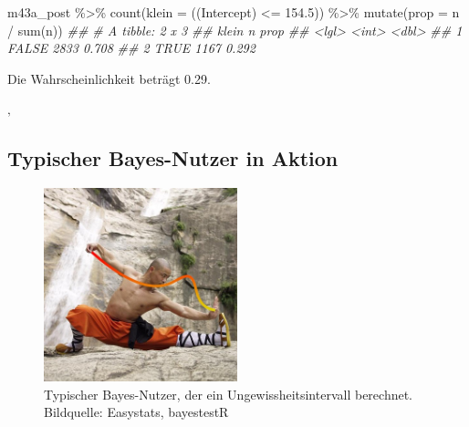 \documentclass[
  a4paper,
  DIV=11]{scrreprt}
\newenvironment{Shaded}{\begin{snugshade}}{\end{snugshade}}
\newcommand{\AttributeTok}[1]{\textcolor[rgb]{0.40,0.45,0.13}{#1}}
\newcommand{\DocumentationTok}[1]{\textcolor[rgb]{0.37,0.37,0.37}{\textit{#1}}}
\newcommand{\FloatTok}[1]{\textcolor[rgb]{0.68,0.00,0.00}{#1}}
\newcommand{\FunctionTok}[1]{\textcolor[rgb]{0.28,0.35,0.67}{#1}}
\newcommand{\NormalTok}[1]{\textcolor[rgb]{0.00,0.23,0.31}{#1}}
\newcommand{\SpecialCharTok}[1]{\textcolor[rgb]{0.37,0.37,0.37}{#1}}
\newcommand{\StringTok}[1]{\textcolor[rgb]{0.13,0.47,0.30}{#1}}
\theoremstyle{definition}
\theoremstyle{remark}
\begin{document}
\begin{Shaded}
\begin{Highlighting}[]
\NormalTok{m43a\_post }\SpecialCharTok{\%\textgreater{}\%} 
  \FunctionTok{count}\NormalTok{(}\AttributeTok{klein =}\NormalTok{ (}\StringTok{\textasciigrave{}}\AttributeTok{(Intercept)}\StringTok{\textasciigrave{}} \SpecialCharTok{\textless{}=} \FloatTok{154.5}\NormalTok{)) }\SpecialCharTok{\%\textgreater{}\%} 
  \FunctionTok{mutate}\NormalTok{(}\AttributeTok{prop =}\NormalTok{ n }\SpecialCharTok{/} \FunctionTok{sum}\NormalTok{(n))}
\DocumentationTok{\#\# \# A tibble: 2 x 3}
\DocumentationTok{\#\#   klein     n  prop}
\DocumentationTok{\#\#   \textless{}lgl\textgreater{} \textless{}int\textgreater{} \textless{}dbl\textgreater{}}
\DocumentationTok{\#\# 1 FALSE  2833 0.708}
\DocumentationTok{\#\# 2 TRUE   1167 0.292}
\end{Highlighting}
\end{Shaded}

Die Wahrscheinlichkeit beträgt 0.29.

‚

\hypertarget{typischer-bayes-nutzer-in-aktion}{%
\subsection{Typischer Bayes-Nutzer in
Aktion}\label{typischer-bayes-nutzer-in-aktion}}

\begin{figure}

{\centering \includegraphics[width=0.5\textwidth,height=\textheight]{./img/bayesianMaster.jpg}

}

\caption{Typischer Bayes-Nutzer, der ein Ungewissheitsintervall
berechnet. Bildquelle: Easystats, bayestestR}

\end{figure}
\end{document}
